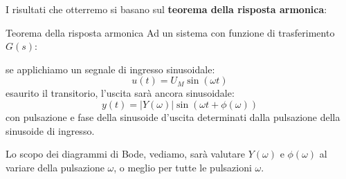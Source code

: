 \documentclass[a4paper,11pt]{article}
\begin{document}
\noindent
\begin{minipage}{\textwidth}
I risultati che otterremo si basano sul \textbf{teorema della risposta armonica}:
\begin{theorem}{Teorema della risposta armonica}
Ad un sistema con funzione di trasferimento $G(s)$:
\begin{center}
\end{center}
se applichiamo un segnale di ingresso sinusoidale:
$$
u(t) = U_M \sin(\omega t)
$$
esaurito il transitorio, l'uscita sarà ancora sinusoidale:
$$
y(t) = |Y(\omega)| \sin\left(\omega t + \phi(\omega)\right)
$$
con pulsazione e fase della sinusoide d'uscita determinati dalla pulsazione della sinusoide di ingresso.
\end{theorem}
\end{minipage}

\par\medskip

Lo scopo dei diagrammi di Bode, vediamo, sarà valutare $Y(\omega)$ e $\phi(\omega)$ al variare della pulsazione $\omega$, o meglio per tutte le pulsazioni $\omega$.
\end{document}
